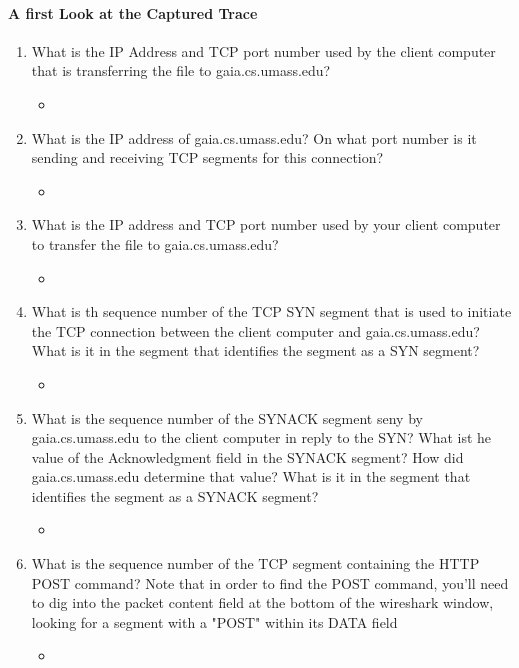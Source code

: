 \documentclass{article}
\begin{document}
\paragraph{A first Look at the Captured Trace}
  \begin{enumerate}
    \item What is the IP Address and TCP port number used by the client computer that is transferring the file to gaia.cs.umass.edu?
      \begin{itemize}
        \item 
        
      \end{itemize}
    \item What is the IP address of gaia.cs.umass.edu?  On what port number is it sending and receiving TCP segments for this connection?
        \begin{itemize}
          \item 
        \end{itemize}

    \item What is the IP address and TCP port number used by your client computer to transfer the file to gaia.cs.umass.edu?
        \begin{itemize}
          \item 
        \end{itemize}

    \item What is th sequence number of the TCP SYN segment that is used to initiate the TCP connection between the client computer and gaia.cs.umass.edu?
    What is it in the segment that identifies the segment as a SYN segment?
        \begin{itemize}
          \item 
        \end{itemize}

    \item What is the sequence number of the SYNACK segment seny by gaia.cs.umass.edu to the client computer in reply to the SYN?  What ist he value of the Acknowledgment field in the SYNACK segment?  How did 
    gaia.cs.umass.edu determine that value?  What is it in the segment that identifies the segment as a SYNACK segment?
        \begin{itemize}
          \item 
        \end{itemize}

    \item What is the sequence number of the TCP segment containing the HTTP POST command?  Note that in order to find the POST command, you'll need to dig into the packet content field at the bottom 
    of the wireshark window, looking for a segment with a "POST" within its DATA field
        \begin{itemize}
          \item 
        \end{itemize}


\end{enumerate}
\end{document}
